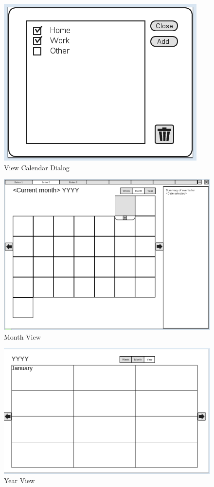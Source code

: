 \documentclass{article}
\begin{document}
\begin{figure}[hb]
\centering
\includegraphics[scale=1]{CMCLGDRViewCalendar.png}
\caption{View Calendar Dialog}
\label{fig:viewcal}
\end{figure}

\begin{figure}[hb]
\centering
\includegraphics[scale=0.5,angle=90]{CMCLGDRMonth.png}
\caption{Month View}
\label{fig:monthview}
\end{figure}

\begin{figure}[hb]
\centering
\includegraphics[scale=0.5,angle=90]{CMCLGDRYear.png}
\caption{Year View}
\label{fig:yearview}
\end{figure}
\end{document}
